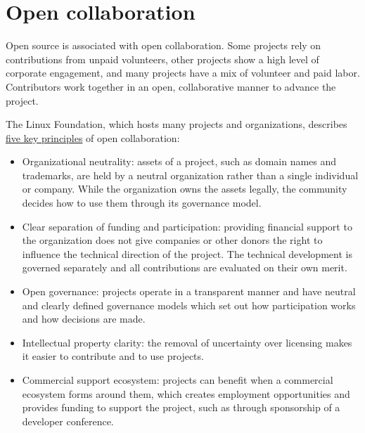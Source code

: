 


\chapter{Open collaboration}

Open source is associated with open collaboration.  Some projects rely on contributions from unpaid volunteers, other projects show a high level of corporate engagement, and many projects have a mix of volunteer and paid labor.  Contributors work together in an open, collaborative manner to advance the project.

The Linux Foundation, which hosts many projects and organizations, describes \href{https://www.linuxfoundation.org/blog/the-linux-foundation-its-not-just-the-linux-operating-system/}{five key principles} of open collaboration:

\begin{itemize}

\item Organizational neutrality: assets of a project, such as domain names and trademarks, are held by a neutral organization rather than a single individual or company.  While the organization owns the assets legally, the community decides how to use them through its governance model.

\item Clear separation of funding and participation: providing financial support to the organization does not give companies or other donors the right to influence the technical direction of the project.  The technical development is governed separately and all contributions are evaluated on their own merit.

\item Open governance: projects operate in a transparent manner and have neutral and clearly defined governance models which set out how participation works and how decisions are made.

\item Intellectual property clarity: the removal of uncertainty over licensing makes it easier to contribute and to use projects.

\item Commercial support ecosystem: projects can benefit when a commercial ecosystem forms around them, which creates employment opportunities and provides funding to support the project, such as through sponsorship of a developer conference.

\end{itemize}

